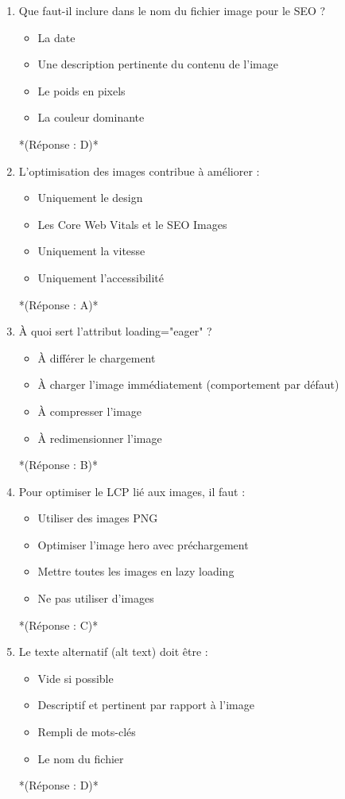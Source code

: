 \documentclass[12pt,a4paper,twoside]{report}
\begin{document}
\begin{enumerate}
\item Que faut-il inclure dans le nom du fichier image pour le SEO ?
\begin{itemize}
\item[A)] La date
\item[B)] Une description pertinente du contenu de l'image
\item[C)] Le poids en pixels
\item[D)] La couleur dominante
\end{itemize}
*(Réponse : D)*

\item L'optimisation des images contribue à améliorer :
\begin{itemize}
\item[A)] Uniquement le design
\item[B)] Les Core Web Vitals et le SEO Images
\item[C)] Uniquement la vitesse
\item[D)] Uniquement l'accessibilité
\end{itemize}
*(Réponse : A)*

\item À quoi sert l'attribut loading="eager" ?
\begin{itemize}
\item[A)] À différer le chargement
\item[B)] À charger l'image immédiatement (comportement par défaut)
\item[C)] À compresser l'image
\item[D)] À redimensionner l'image
\end{itemize}
*(Réponse : B)*

\item Pour optimiser le LCP lié aux images, il faut :
\begin{itemize}
\item[A)] Utiliser des images PNG
\item[B)] Optimiser l'image hero avec préchargement
\item[C)] Mettre toutes les images en lazy loading
\item[D)] Ne pas utiliser d'images
\end{itemize}
*(Réponse : C)*

\item Le texte alternatif (alt text) doit être :
\begin{itemize}
\item[A)] Vide si possible
\item[B)] Descriptif et pertinent par rapport à l'image
\item[C)] Rempli de mots-clés
\item[D)] Le nom du fichier
\end{itemize}
*(Réponse : D)*


\end{enumerate}
\end{document}
